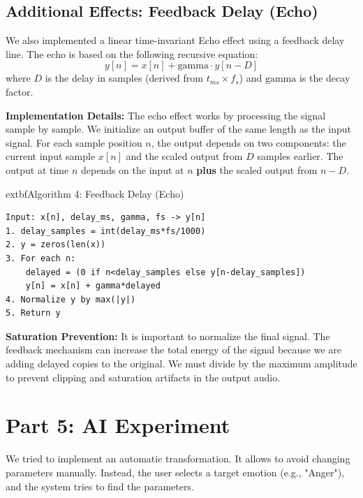 \documentclass[12pt,letterpaper]{article}
\begin{document}
\subsection{Additional Effects: Feedback Delay (Echo)}
We also implemented a linear time-invariant Echo effect using a feedback delay line. The echo is based on the following recursive equation:
\begin{equation}
    y[n] = x[n] + \text{gamma} \cdot y[n-D]
\end{equation}
where $D$ is the delay in samples (derived from $t_{ms} \times f_s$) and $\text{gamma}$ is the decay factor.

\textbf{Implementation Details:}
The echo effect works by processing the signal sample by sample. We initialize an output buffer of the same length as the input signal. For each sample position $n$, the output depends on two components: the current input sample $x[n]$ and the scaled output from $D$ samples earlier. The output at time $n$ depends on the input at $n$ \textbf{plus} the scaled output from $n-D$.

	extbf{Algorithm 4: Feedback Delay (Echo)}
\begin{verbatim}
Input: x[n], delay_ms, gamma, fs -> y[n]
1. delay_samples = int(delay_ms*fs/1000)
2. y = zeros(len(x))
3. For each n:
    delayed = (0 if n<delay_samples else y[n-delay_samples])
    y[n] = x[n] + gamma*delayed
4. Normalize y by max(|y|)
5. Return y
\end{verbatim}

\textbf{Saturation Prevention:}
It is important to normalize the final signal. The feedback mechanism can increase the total energy of the signal because we are adding delayed copies to the original. We must divide by the maximum amplitude to prevent clipping and saturation artifacts in the output audio.

\section{Part 5: AI Experiment}
We tried to implement an automatic transformation. It allows to avoid changing parameters manually. Instead, the user selects a target emotion (e.g., "Anger"), and the system tries to find the parameters.
\end{document}
